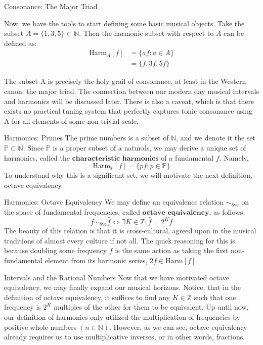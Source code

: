 \documentclass[usenames,dvipsnames]{beamer}
\newcommand{\N}{\mathbb{N}}
\newcommand{\Z}{\mathbb{Z}}
\newcommand{\Prms}{\mathbb{P}}
\newcommand{\octave}{\sim_{8\text{ve}}}
\newcommand{\harm}{\text{Harm}}
\begin{document}
  \begin{frame}{Consonance: The Major Triad}

Now, we have the tools to start defining some basic musical objects. Take the subset $A  = \{1,3,5\} \subset \N$. Then the harmonic subset with respect to $A$ can be defined as: 
  \begin{align*}
  \text{Harm}_A [f] &= \{af : a \in A\} \\
			    &=\{f,3f,5f\}
   \end{align*}

The subset A is precisely the holy grail of consonance, at least in the Western canon: the major triad. The connection between our modern day musical intervals and harmonics will be discussed later. There is also a caveat, which is that there exists no practical tuning system that perfectly captures tonic consonance using A for all elements of some non-trivial scale.

  \end{frame}
  
    \begin{frame}{Harmonics: Primes}
The prime numbers is a subset of $\mathbb{N}$, and we denote it the set $\mathbb{P} \subset \mathbb{N}$. Since $\mathbb{P}$ is a proper subset of a naturals, we may derive a unique set of harmonics, called the $\textbf{characteristic harmonics}$ of a fundamental $f$. Namely,
$$   \text{Harm}_\Prms [f] = \{pf : p \in \mathbb{P}\} $$
To understand why this is a significant set, we will motivate the next definition, octave equivalency.
  \end{frame}
  
  \begin{frame}{Harmonics: Octave Equivalency}
  We may define an equivalence relation $\octave$ on the space of fundamental frequencies, called $\textbf{octave equivalency}$, as follows:
  $$ f  \octave \hat{f} \iff \exists K \in \Z : \hat{f} = 2^{K} f $$
  The beauty of this relation is that it is cross-cultural, agreed upon in the musical traditions of almost every culture if not all. The quick reasoning for this is because doubling some frequency $f$ is the same action as taking the first non-fundamental element from its harmonic series, $2f \in \harm [f]$.
  \end{frame}
  
  \begin{frame}{Intervals and the Rational Numbers}
  Now that we have motivated octave equivalency, we may finally expand our musical horizons. Notice, that in the definition of octave equivalency, it suffices to find any $K \in \Z$ such that one frequency is $2^K$ multiples of the other for them to be equivalent. \newline Up until now, our definition of harmonics only utilized the multiplication of frequencies by positive whole numbers $(n \in \N)$. However, as we can see, octave equivalency already requires us to use multiplicative inverses, or in other words, fractions.
  \end{frame}
  
\end{document}
